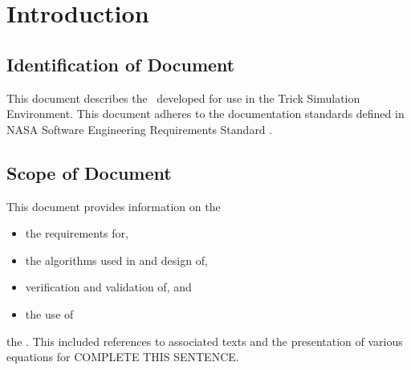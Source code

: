 \documentclass[twoside,11pt,titlepage]{report}
\begin{document}

\date{DATE}
\modelname{\MODEL}
\doctype{}
\author{YOUR NAME}
\makeTrickhlaenvTitlepage



\tableofcontents
\vfill

\pagebreak


\chapter{Introduction}


\section{Identification of Document}
This document describes the \MODEL\ developed
for use in the Trick Simulation Environment.
This document adheres to the documentation standards
defined in NASA Software Engineering Requirements Standard \cite{NASA:SWE}.

\section{Scope of Document}
This document provides information on the
\begin{itemize}
\item the requirements for,
\item the algorithms used in and design of,
\item verification and validation of, and
\item the use of
\end{itemize}
the \MODEL.  This included references to associated texts and the
presentation of various equations for COMPLETE THIS SENTENCE.
\end{document}
